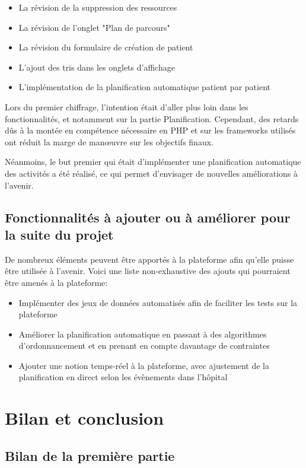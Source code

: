\documentclass[noposter]{polytech/polytech}
\begin{document}
\begin{itemize}
	\item La révision de la suppression des ressources
	\item La révision de l'onglet "Plan de parcours"
	\item La révision du formulaire de création de patient
	\item L'ajout des tris dans les onglets d'affichage
	\item L'implémentation de la planification automatique patient par patient
\end{itemize}

Lors du premier chiffrage, l'intention était d'aller plus loin dans les fonctionnalités, et notamment sur la partie Planification. Cependant, des retards dûs à la montée en compétence nécessaire en PHP et sur les frameworks utilisés ont réduit la marge de manœuvre sur les objectifs finaux. 

Néanmoins, le but premier qui était d'implémenter une planification automatique des activités a été réalisé, ce qui permet d'envisager de nouvelles améliorations à l'avenir.


\section{Fonctionnalités à ajouter ou à améliorer pour la suite du projet}


De nombreux éléments peuvent être apportés à la plateforme afin qu'elle puisse être utilisée à l'avenir. Voici une liste non-exhaustive des ajouts qui pourraient être amenés à la plateforme:

\begin{itemize}
	\item Implémenter des jeux de données automatisés afin de faciliter les tests sur la plateforme
	\item Améliorer la planification automatique en passant à des algorithmes d'ordonnancement et en prenant en compte davantage de contraintes
	\item Ajouter une notion temps-réel à la plateforme, avec ajustement de la planification en direct selon les évènements dans l'hôpital
\end{itemize}


\chapter*{Bilan et conclusion}

\section*{Bilan de la première partie}
\end{document}

